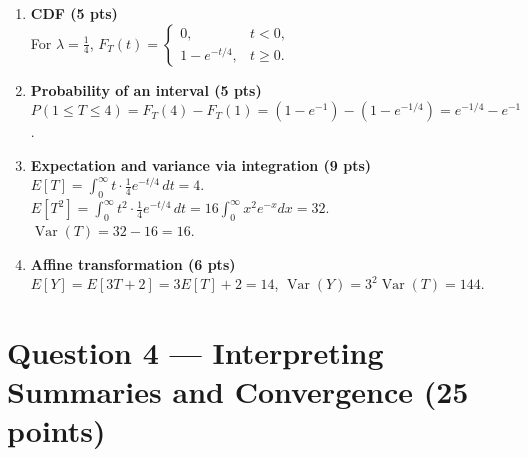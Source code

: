 \documentclass[11pt]{article}
\begin{document}
\begin{enumerate}
  \item \textbf{CDF (5 pts)}\\
  For $\lambda = \tfrac{1}{4}$, $\displaystyle F_T(t) = \begin{cases} 0, & t<0,\\ 1 - e^{-t/4}, & t\ge 0.\end{cases}$

  \item \textbf{Probability of an interval (5 pts)}\\
  $P(1 \le T \le 4) = F_T(4) - F_T(1) = (1 - e^{-1}) - (1 - e^{-1/4}) = e^{-1/4} - e^{-1}$.

  \item \textbf{Expectation and variance via integration (9 pts)}\\
  $E[T] = \int_0^\infty t \cdot \tfrac{1}{4} e^{-t/4}\, dt = 4$.\\
  $E[T^2] = \int_0^\infty t^2 \cdot \tfrac{1}{4} e^{-t/4}\, dt = 16\int_0^\infty x^2 e^{-x}dx = 32$.\\
  $\operatorname{Var}(T) = 32 - 16 = 16$.

  \item \textbf{Affine transformation (6 pts)}\\
  $E[Y] = E[3T+2] = 3E[T] + 2 = 14$, \quad $\operatorname{Var}(Y) = 3^2\operatorname{Var}(T) = 144$.
\end{enumerate}

\section*{Question 4 — Interpreting Summaries and Convergence (25 points)}
\end{document}
